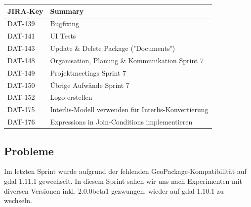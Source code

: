\begin{table}[H]	
\centering
\begin{tabular}{ll}
\toprule
\textbf{JIRA-Key} & \textbf{Summary}\\
\midrule
DAT-139 & Bugfixing \\
DAT-141 & UI Tests \\
DAT-143 & Update \& Delete Package ("Documents") \\
DAT-148 & Organisation, Planung \& Kommunikation Sprint 7 \\
DAT-149 & Projektmeetings Sprint 7 \\
DAT-150 & Übrige Aufwände Sprint 7 \\
DAT-152 & Logo erstellen \\
DAT-175 & Interlis-Modell verwenden für Interlis-Konvertierung \\
DAT-176 & Expressions in Join-Conditions implementieren \\
\bottomrule
\end{tabular}	
\end{table}

\subsection*{Probleme}
Im letzten Sprint wurde aufgrund der fehlenden GeoPackage-Kompatibilität auf \acs{gdal} 1.11.1 gewechselt. In diesem Sprint sahen wir uns nach Experimenten mit diversen Versionen inkl. 2.0.0beta1 gezwungen, wieder auf \acs{gdal} 1.10.1 zu wechseln.